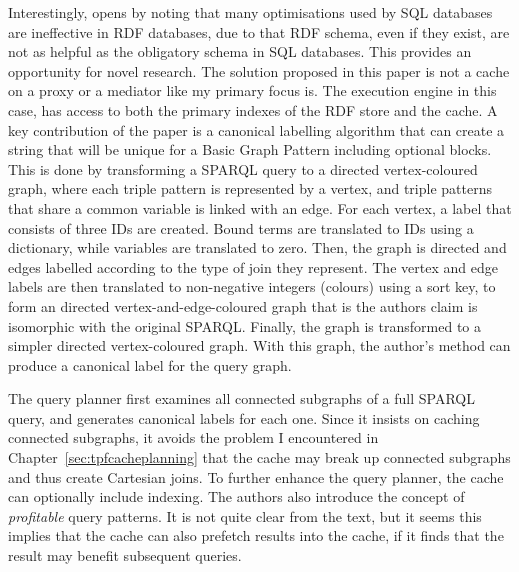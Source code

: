 Interestingly, \cite{papailiou2015graph} opens by noting that many
optimisations used by SQL databases are ineffective in RDF databases,
due to that RDF schema, even if they exist, are not as helpful as the
obligatory schema in SQL databases. This provides an opportunity for
novel research. The solution proposed in this paper is not a cache on
a proxy or a mediator like my primary focus is. The execution engine
in this case, has access to both the primary indexes of the RDF store
and the cache. A key contribution of the paper is a canonical
labelling algorithm that can create a string that will be unique for a
Basic Graph Pattern including optional blocks. This is done by
transforming a SPARQL query to a directed vertex-coloured graph, where
each triple pattern is represented by a vertex, and triple patterns
that share a common variable is linked with an edge. For each vertex,
a label that consists of three IDs are created. Bound terms are
translated to IDs using a dictionary, while variables are translated
to zero. Then, the graph is directed and edges labelled according to
the type of join they represent. The vertex and edge labels are then
translated to non-negative integers (colours) using a sort key, to
form an directed vertex-and-edge-coloured graph that is the authors
claim is isomorphic with the original SPARQL. Finally, the graph is
transformed to a simpler directed vertex-coloured graph. With this
graph, the author's method can produce a canonical label for the query
graph.

The query planner first examines all connected subgraphs of a full
SPARQL query, and generates canonical labels for each one. Since it
insists on caching connected subgraphs, it avoids the problem I
encountered in Chapter~\ref{sec:tpfcacheplanning} that the cache may
break up connected subgraphs and thus create Cartesian joins. To
further enhance the query planner, the cache can optionally include
indexing. The authors also introduce the concept of
\textit{profitable} query patterns. It is not quite clear from the
text, but it seems this implies that the cache can also prefetch
results into the cache, if it finds that the result may benefit
subsequent queries.


